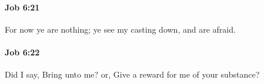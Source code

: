 		\paragraph{Job 6:21} %
			\label{JOB-6-21}

			For now ye are nothing; ye see my casting down, and are afraid.


		\paragraph{Job 6:22} %
			\label{JOB-6-22}

			Did I say, Bring unto me? or, Give a reward for me of your substance?


